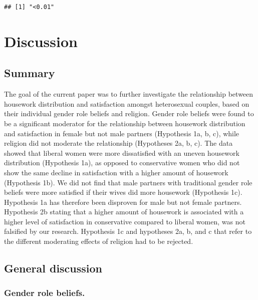 \documentclass[
  man,floatsintext]{apa6}
\begin{document}
\begin{verbatim}
## [1] "<0.01"
\end{verbatim}

\hypertarget{discussion}{%
\section{Discussion}\label{discussion}}

\hypertarget{summary}{%
\subsection{Summary}\label{summary}}

The goal of the current paper was to further investigate the relationship between housework distribution and satisfaction amongst heterosexual couples, based on their individual gender role beliefs and religion. Gender role beliefs were found to be a significant moderator for the relationship between housework distribution and satisfaction in female but not male partners (Hypothesis 1a, b, c), while religion did not moderate the relationship (Hypotheses 2a, b, c). The data showed that liberal women were more dissatisfied with an uneven housework distribution (Hypothesis 1a), as opposed to conservative women who did not show the same decline in satisfaction with a higher amount of housework (Hypothesis 1b). We did not find that male partners with traditional gender role beliefs were more satisfied if their wives did more housework (Hypothesis 1c).
Hypothesis 1a has therefore been disproven for male but not female partners. Hypothesis 2b stating that a higher amount of housework is associated with a higher level of satisfaction in conservative compared to liberal women, was not falsified by our research. Hypothesis 1c and hypotheses 2a, b, and c that refer to the different moderating effects of religion had to be rejected.

\hypertarget{general-discussion}{%
\subsection{General discussion}\label{general-discussion}}

\hypertarget{gender-role-beliefs.}{%
\subsubsection{Gender role beliefs.}\label{gender-role-beliefs.}}
\end{document}
